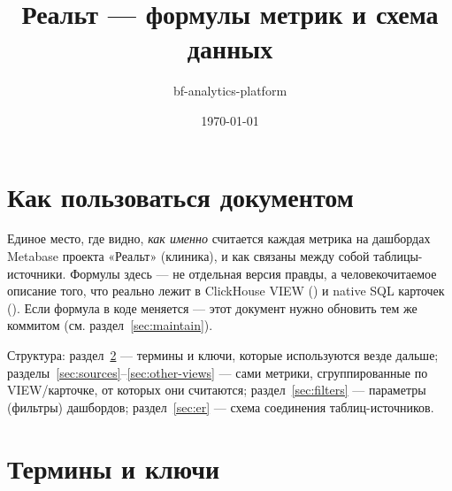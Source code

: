 \documentclass[11pt,a4paper]{article}
\title{Реальт --- формулы метрик и схема данных}
\author{bf-analytics-platform}
\date{\today}
\begin{document}
\maketitle
\tableofcontents
\clearpage

\section{Как пользоваться документом}

Единое место, где видно, \emph{как именно} считается каждая метрика на
дашбордах Metabase проекта «Реальт» (клиника), и как связаны между собой
таблицы-источники. Формулы здесь --- не отдельная версия правды, а
человекочитаемое описание того, что реально лежит в ClickHouse VIEW
(\texttt{}) и native SQL карточек
(\texttt{}). Если формула в коде меняется ---
этот документ нужно обновить тем же коммитом (см.
раздел~\ref{sec:maintain}).

Структура: раздел~\ref{sec:terms} --- термины и ключи, которые
используются везде дальше; разделы~\ref{sec:sources}--\ref{sec:other-views}
--- сами метрики, сгруппированные по VIEW/карточке, от которых они
считаются; раздел~\ref{sec:filters} --- параметры (фильтры) дашбордов;
раздел~\ref{sec:er} --- схема соединения таблиц-источников.

\section{Термины и ключи}
\label{sec:terms}
\end{document}
